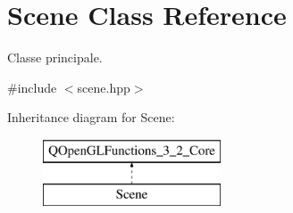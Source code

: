 \hypertarget{class_scene}{\section{Scene Class Reference}
\label{class_scene}
}


Classe principale.  




{\ttfamily \#include $<$scene.\+hpp$>$}

Inheritance diagram for Scene\+:\begin{figure}[H]
\begin{center}
\leavevmode
\includegraphics[height=2.000000cm]{class_scene}
\end{center}
\end{figure}
